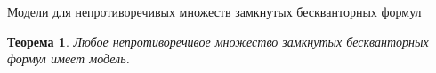 \documentclass[aspectratio=169]{beamer}
\newtheorem{thm}{Теорема}[section]
\newtheorem{flw}{Следствие}[section]
\begin{document}

\newcommand\doubleplus{+\kern-1.3ex+\kern0.8ex}
\newcommand\mdoubleplus{\ensuremath{\mathbin{+\mkern-10mu+}}}

\begin{frame}{Модели для непротиворечивых множеств замкнутых бескванторных формул}
\begin{thm}
Любое непротиворечивое множество замкнутых бескванторных формул имеет модель.
\end{thm}

\end{frame}
\end{document}
